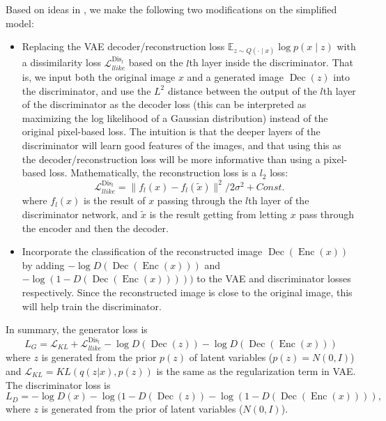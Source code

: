 \documentclass[10pt]{article}
\newcommand{\op}[1]{\operatorname{#1}}
\renewcommand{\tilde}[1]{\widetilde{#1}}
\begin{document}
Based on ideas in \cite{larsen2015autoencoding}, we make the following two modifications on the simplified model:
\begin{itemize}
\item Replacing the VAE decoder/reconstruction loss $\mathbb{E}_{z \sim Q(\cdot \mid x)} \log p(x \mid z)$ with a dissimilarity loss $\mathcal{L}_{llike}^{\op{Dis}_l}$ based on the $l$th layer inside the discriminator. That is, we input both the original image $x$ and a generated image $\op{Dec}(z)$ into the discriminator, and use the $L^2$ distance between the output of the $l$th layer of the discriminator as the decoder loss (this can be interpreted as maximizing the log likelihood of a Gaussian distribution) instead of the original pixel-based loss. The intuition is that the deeper layers of the discriminator will learn good features of the images, and that using this as the decoder/reconstruction loss will be more informative than using a pixel-based loss. Mathematically, the reconstruction loss is a $l_2$ loss:
$$
\mathcal{L}_{llike}^{\op{Dis}_l} = \|f_l(x) - f_l(\tilde{x})\|^2 / 2\sigma^2 +Const. 
$$
where $f_l(x)$ is the result of $x$ passing through the $l$th layer of the discriminator network, and $\tilde x$ is the result getting from letting $x$ pass through the encoder and then the decoder. 

\item Incorporate the classification of the reconstructed image $\op{Dec}(\op{Enc}(x))$ by adding $-\log D(\op{Dec}(\op{Enc}(x)))$ and $-\log (1-D(\op{Dec}(\op{Enc}(x)))))$ to the VAE and discriminator losses respectively. Since the reconstructed image is close to the original image, this will help train the discriminator.
\end{itemize}

In summary, the generator loss is 
\begin{equation}\label{vaegan1}
L_G = \mathcal{L}_{KL} + \mathcal{L}_{llike}^{\op{Dis}_l} -\log D(\op{Dec}(z)) -\log D(\op{Dec}(\op{Enc}(x)))
\end{equation}
where $z$ is generated from the prior $p(z)$ of latent variables ($p(z) = N(0,I)$) and $\mathcal{L}_{KL} = KL(q(z|x),p(z))$ is the same as the regularization term in VAE. 
The discriminator loss is
\begin{equation}\label{vaegan2}
L_D = -\log D(x) - \log (1-D(\op{Dec}(z)) -\log (1-D(\op{Dec}(\op{Enc}(x)))),
\end{equation}
where $z$ is generated from the prior of latent variables ($N(0,I)$).
\end{document}
